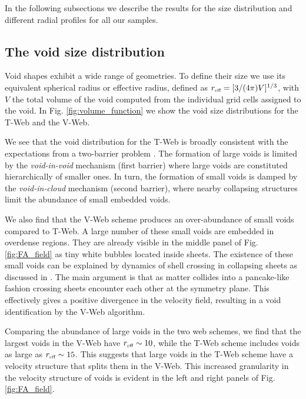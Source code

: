 \documentclass[a4,useAMS,usenatbib,usegraphicx]{mn2e}
\newcommand{\hMpc}{{\ifmmode{h^{-1}{\rm Mpc}}\else{$h^{-1}$Mpc}\fi}}
\newcommand{\reff}{{\ifmmode{r_{\mbox{\tiny eff}}}\else{$r_{\mbox{\tiny eff}}$}\fi}}
\begin{document}
In the following subsections we describe the results for the size
distribution and different radial profiles for all our samples.

\subsection{The void size distribution}
\label{subsec:shape_voids}

Void shapes exhibit a wide range of geometries.
To define their size we use its equivalent spherical radius or
effective radius, defined as $\reff = [3/(4\pi)V]^{1/3}$, with $V$ the 
total volume of the void computed from the individual grid cells
assigned to the void.   
In Fig. \ref{fig:volume_function} we show the void size
distributions for the T-Web and the V-Web.

We see that the void distribution for the T-Web is broadly consistent with the
expectations from a two-barrier problem  \citep{Sheth04}. 
The formation of large voids is limited by the \textit{void-in-void}
mechanism (first barrier) where large voids are constituted
hierarchically of smaller ones. 
In turn, the formation of small voids is damped by the
\textit{void-in-cloud} mechanism (second barrier),  where nearby
collapsing structures limit the abundance of small embedded voids.  

We also find that the V-Web scheme produces an over-abundance of small
voids compared to T-Web.
A large number of these small voids are embedded in overdense regions. 
They are already visible in the middle panel of Fig. \ref{fig:FA_field} as
tiny white bubbles located inside sheets.
The existence of these small voids can be explained by
dynamics of shell crossing in collapsing sheets as discussed in
\citet{Hoffman12}.    
The main argument is that as matter collides into a pancake-like
fashion crossing sheets encounter each other at the symmetry plane.
This effectively gives a positive divergence in the velocity
field, resulting in a void identification by the V-Web algorithm. 


Comparing the abundance of large voids in the two web schemes, we find
that the largest voids in the V-Web have $\reff \sim 10$\hMpc,
while the T-Web scheme includes voids as large as $\reff \sim 15$\hMpc. 
This suggests that large voids in the T-Web scheme have a velocity
structure that splits them in the V-Web. 
This increased granularity in the velocity structure of voids is
evident in the left and right panels of Fig. \ref{fig:FA_field}. 
\end{document}
